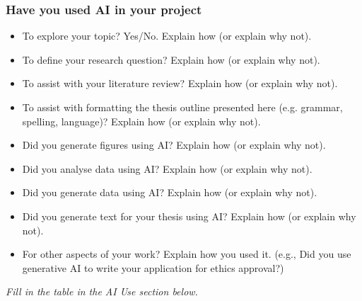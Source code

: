 \documentclass[12pt,openany,a4paper]{book}
\newcommand{\purple}[1]{\textcolor{topicpurple}{\textit{#1}}}
\begin{document}
\subsubsection*{Have you used AI in your project}
\begin{itemize}[leftmargin=1.5em]
  \item To explore your topic? {Yes/No}. Explain how (or explain why not).
  \item To define your research question? Explain how (or explain why not).
  \item To assist with your literature review? Explain how (or explain why not).
  \item To assist with formatting the thesis outline presented here (e.g. grammar, spelling, language)? Explain how (or explain why not).
  \item Did you generate figures using AI? Explain how (or explain why not).
  \item Did you analyse data using AI? Explain how (or explain why not).
  \item Did you generate data using AI? Explain how (or explain why not).
  \item Did you generate text for your thesis using AI? Explain how (or explain why not).
  \item For other aspects of your work? Explain how you used it. (e.g., Did you use generative AI to write your application for ethics approval?)
\end{itemize}

\purple{Fill in the table in the AI Use section below.}

\newpage

\let\origcleardoublepage\cleardoublepage
\let\cleardoublepage\clearpage
\frontmatter
\let\cleardoublepage\origcleardoublepage
\end{document}
